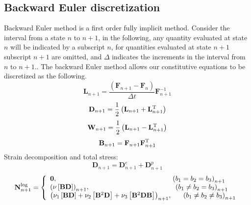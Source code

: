 \label{}
\subsection{Backward Euler discretization}
\label{}
Backward Euler method is a first order fully implicit method. Consider the interval from a state $n$ to $n+1$, in the following, any quantity evaluated at state $n$ will be indicated by a subscript $n$, for quantities evaluated at state $n+1$ subscript $n+1$ are omitted, and $\Delta$ indicates the increments in the interval from $n$ to $n+1$.. The backward Euler method allows our constitutive equations to be discretized as the following.
\begin{equation}
{{\mathbf{L}}_{n + 1}} = \frac{{\left( {{{\mathbf{F}}_{n + 1}} - {{\mathbf{F}}_n}} \right)}}{{\Delta t}}{\mathbf{F}}_{n + 1}^{ - 1}
\end{equation}
\begin{equation}
{{\mathbf{D}}_{n + 1}} = \frac{1}{2}\left( {{{\mathbf{L}}_{n + 1}} + {\mathbf{L}}_{n + 1}^{\rm{T}}} \right)
\end{equation}
\begin{equation}
{{\mathbf{W}}_{n + 1}} = \frac{1}{2}\left( {{{\mathbf{L}}_{n + 1}} - {\mathbf{L}}_{n + 1}^{\rm{T}}} \right)
\end{equation}
\begin{equation}
{{\mathbf{B}}_{n + 1}} = {{\mathbf{F}}_{n + 1}}{\mathbf{F}}_{n + 1}^{\rm{T}}
\end{equation}
Strain decomposition and total stress:
\begin{equation}
{\mathbf{D}}_{n + 1} = {\mathbf{D}}^e_{n + 1} + {\mathbf{D}}^p_{n + 1}
\end{equation}
\begin{equation}
{\bf{N}}_{n + 1}^{\log } = \left\{ {\begin{array}{*{20}{l}}
{{\bf{0}},{\rm{\qquad\qquad\qquad\qquad\qquad\qquad\qquad\qquad\ \ \,}}{{\left( {{b_1} = {b_2} = {b_3}} \right)}_{n + 1}}}\\
{{{\left( {\nu \left[ {{\bf{BD}}} \right]} \right)}_{n + 1}},{\rm{\qquad\qquad\qquad\qquad\qquad\quad\ \ \ \ \,}}{{\left( {{b_1} \ne {b_2} = {b_3}} \right)}_{n + 1}}}\\
{{{\left( {{\nu _1}\left[ {{\bf{BD}}} \right] + {\nu _2}\left[ {{{\bf{B}}^2}{\bf{D}}} \right] + {\nu _3}\left[ {{{\bf{B}}^2}{\bf{DB}}} \right]} \right)}_{n + 1}},{\rm{\ \ \ \ \ }}{{\left( {{b_1} \ne {b_2} \ne {b_3}} \right)}_{n + 1}}}
\end{array}} \right.
\end{equation}
